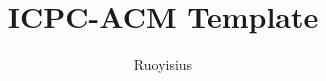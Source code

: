 \documentclass[11pt, a4paper, oneside]{ctexart}
\begin{document}
    \title{ICPC-ACM Template}
    \author{Ruoyisius}
    \maketitle
    \restoregeometry

    \tableofcontents
    \clearpage

    
    \clearpage

    
    \clearpage

    
    \clearpage

    
    \clearpage

    
    \clearpage

    
    \clearpage

    
    \clearpage

\end{document}
